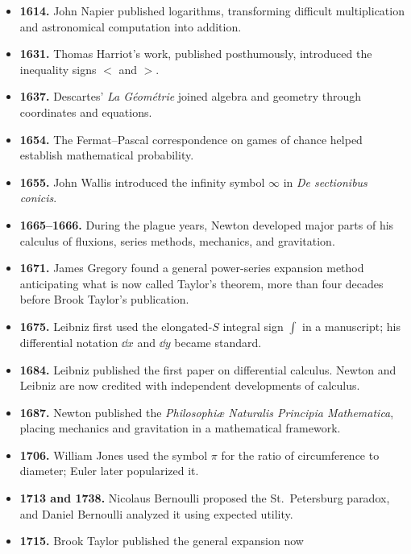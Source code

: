 \begin{itemize}
              $=$ in \textit{The Whetstone of Witte}.
        \item \textbf{1614.} John Napier published logarithms, transforming
              difficult multiplication and astronomical computation into
              addition.
        \item \textbf{1631.} Thomas Harriot's work, published posthumously,
              introduced the inequality signs $<$ and $>$.
        \item \textbf{1637.} Descartes' \textit{La Géométrie} joined algebra
              and geometry through coordinates and equations.
        \item \textbf{1654.} The Fermat--Pascal correspondence on games of
              chance helped establish mathematical probability.
        \item \textbf{1655.} John Wallis introduced the infinity symbol
              $\infty$ in \textit{De sectionibus conicis}.
        \item \textbf{1665--1666.} During the plague years, Newton developed
              major parts of his calculus of fluxions, series methods,
              mechanics, and gravitation.
        \item \textbf{1671.} James Gregory found a general power-series
              expansion method anticipating what is now called Taylor's theorem,
              more than four decades before Brook Taylor's publication.
        \item \textbf{1675.} Leibniz first used the elongated-$S$ integral sign
              $\int$ in a manuscript; his differential notation
              $\dd x$ and $\dd y$ became standard.
        \item \textbf{1684.} Leibniz published the first paper on differential
              calculus. Newton and Leibniz are now credited with independent
              developments of calculus.
        \item \textbf{1687.} Newton published the
              \textit{Philosophiæ Naturalis Principia Mathematica}, placing
              mechanics and gravitation in a mathematical framework.
        \item \textbf{1706.} William Jones used the symbol $\pi$ for the ratio
              of circumference to diameter; Euler later popularized it.
        \item \textbf{1713 and 1738.} Nicolaus Bernoulli proposed the
              St.\ Petersburg paradox, and Daniel Bernoulli analyzed it using
              expected utility.
        \item \textbf{1715.} Brook Taylor published the general expansion now

\end{itemize}
